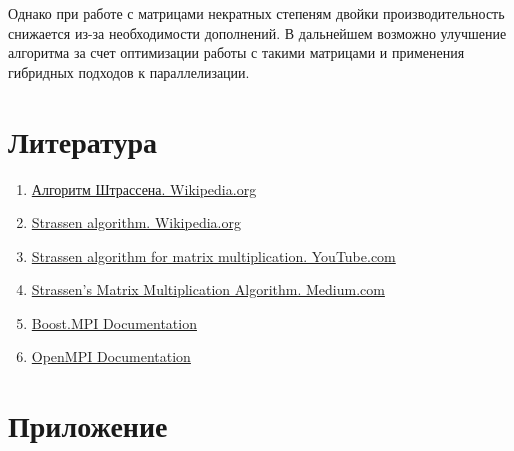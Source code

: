 \documentclass[a4paper, 14pt]{extarticle}
\begin{document}
Однако при работе с матрицами некратных степеням двойки производительность снижается из-за необходимости дополнений. В дальнейшем возможно улучшение алгоритма за счет оптимизации работы с такими матрицами и применения гибридных подходов к параллелизации.

    \newpage
    \section{Литература}
\begin{enumerate}
    \item \href{https://ru.wikipedia.org/wiki/%D0%90%D0%BB%D0%B3%D0%BE%D1%80%D0%B8%D1%82%D0%BC_%D0%A8%D1%82%D1%80%D0%B0%D1%81%D1%81%D0%B5%D0%BD%D0%B0}{Алгоритм Штрассена. Wikipedia.org}
    \item \href{https://en.wikipedia.org/wiki/Strassen_algorithm}{Strassen algorithm. Wikipedia.org}
    \item \href{https://youtu.be/OSelhO6Qnlc?si=hPwljRSC7fxsv0gp}{Strassen algorithm for matrix multiplication. YouTube.com}
    \item \href{https://medium.com/swlh/strassens-matrix-multiplication-algorithm-936f42c2b344}{Strassen’s Matrix Multiplication Algorithm. Medium.com}
    \item \href{https://www.boost.org/doc/libs/1_87_0/doc/html/mpi.html}{Boost.MPI Documentation}
    \item \href{https://www.open-mpi.org/doc/}{OpenMPI Documentation}
\end{enumerate}

    \newpage
    \section{Приложение}
\end{document}
